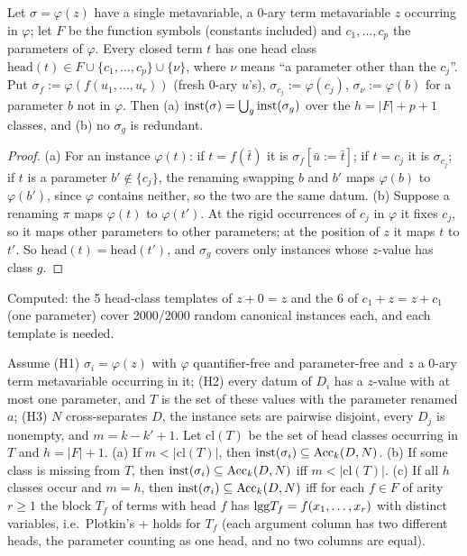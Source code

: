 \begin{proposition}\label{prop:many:heads}
Let $\sigma=\varphi(z)$ have a single metavariable, a 0-ary term metavariable $z$ occurring in $\varphi$; let $F$ be the
function symbols (constants included) and $c_1,\dots,c_p$ the parameters of $\varphi$. Every closed term $t$ has one head
class $\mathrm{head}(t)\in F\cup\{c_1,\dots,c_p\}\cup\{\nu\}$, where $\nu$ means ``a parameter other than the $c_j$''. Put
$\sigma_f:=\varphi(f(u_1,\dots,u_r))$ (fresh 0-ary $u$'s), $\sigma_{c_j}:=\varphi(c_j)$, $\sigma_\nu:=\varphi(b)$ for a
parameter $b$ not in $\varphi$. Then (a) $\mathrm{inst}(\sigma)=\bigcup_g\mathrm{inst}(\sigma_g)$ over the $h=|F|+p+1$ classes, and (b) no
$\sigma_g$ is redundant.
\end{proposition}
\begin{proof}
(a) For an instance $\varphi(t)$: if $t=f(\bar t)$ it is $\sigma_f[\bar u:=\bar t]$; if $t=c_j$ it is $\sigma_{c_j}$; if $t$ is
a parameter $b'\notin\{c_j\}$, the renaming swapping $b$ and $b'$ maps $\varphi(b)$ to $\varphi(b')$, since $\varphi$ contains
neither, so the two are the same datum. (b) Suppose a renaming $\pi$ maps $\varphi(t)$ to $\varphi(t')$. At the rigid
occurrences of $c_j$ in $\varphi$ it fixes $c_j$, so it maps other parameters to other parameters; at the position of $z$
it maps $t$ to $t'$. So $\mathrm{head}(t)=\mathrm{head}(t')$, and $\sigma_g$ covers only instances whose $z$-value has
class $g$.
\end{proof}
Computed: the 5 head-class templates of $z+0=z$ and the 6 of $c_1+z=z+c_1$ (one parameter) cover 2000/2000 random canonical
instances each, and each template is needed.

\begin{proposition}\label{prop:many:onevar}
Assume (H1) $\sigma_i=\varphi(z)$ with $\varphi$ quantifier-free and parameter-free and $z$ a 0-ary term metavariable occurring
in it; (H2) every datum of $D_i$ has a $z$-value with at most one parameter, and $T$ is the set of these values with the
parameter renamed $a$; (H3) $N$ cross-separates $D$, the instance sets are pairwise disjoint, every $D_j$ is nonempty, and
$m=k-k'+1$. Let $\mathrm{cl}(T)$ be the set of head classes occurring in $T$ and $h=|F|+1$. (a) If $m<|\mathrm{cl}(T)|$,
then $\mathrm{inst}(\sigma_i)\subseteq\mathrm{Acc}_k(D,N)$. (b) If some class is missing from $T$, then $\mathrm{inst}(\sigma_i)\subseteq\mathrm{Acc}_k(D,N)$ iff
$m<|\mathrm{cl}(T)|$. (c) If all $h$ classes occur and $m=h$, then $\mathrm{inst}(\sigma_i)\subseteq\mathrm{Acc}_k(D,N)$ iff for each $f\in F$ of
arity $r\ge1$ the block $T_f$ of terms with head $f$ has $\mathrm{lgg} T_f=f(x_1,\dots,x_r)$ with distinct variables, i.e.\ Plotkin's
\evR{}+\evD{} holds for $T_f$ (each argument column has two different heads, the parameter counting as one head, and no two
columns are equal).
\end{proposition}

